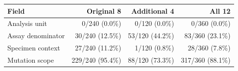\begin{tabular}{@{}lrrr@{}}
\toprule
Field & Original 8 & Additional 4 & All 12\\
\midrule
Analysis unit & 0/240 (0.0\%) & 0/120 (0.0\%) & 0/360 (0.0\%)\\
Assay denominator & 30/240 (12.5\%) & 53/120 (44.2\%) & 83/360 (23.1\%)\\
Specimen context & 27/240 (11.2\%) & 1/120 (0.8\%) & 28/360 (7.8\%)\\
Mutation scope & 229/240 (95.4\%) & 88/120 (73.3\%) & 317/360 (88.1\%)\\
\bottomrule
\end{tabular}

